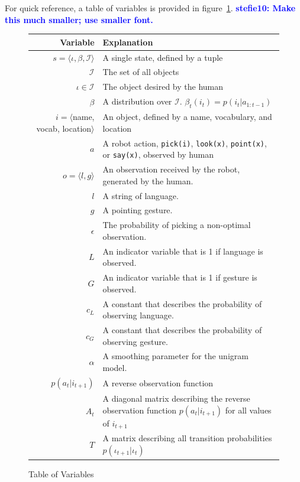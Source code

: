 \documentclass[conference]{IEEEtran}
\newcommand{\stnote}[1]{\textcolor{blue}{\textbf{stefie10: #1}}}
\newcommand{\Iota}{\mathcal{I}}
\begin{document}
For quick reference, a table of variables is provided in figure~\ref{fig:vars}. 
\stnote{Make this much smaller; use smaller font.}
\begin{figure}
	\begin{center}
		\begin{tabular}{r l}
			\hline
			Variable & Explanation\\
			\hline
			$s = \langle \iota, \beta, \Iota \rangle$ & A single state, defined by a tuple \\
			$\Iota$ & The set of all objects \\
			$\iota \in \Iota$ & The object desired by the human \\
			$\beta$ & A distribution over $\Iota$. $\beta_t(i_t) = p(i_t | a_{1:t-1})$ \\
			$i = \langle$name, vocab, location$\rangle$ & An object, defined by a name, vocabulary, and location \\
			$a$ & A robot action, \texttt{pick(i)}, \texttt{look(x)}, \texttt{point(x)}, or \texttt{say(x)}, observed by human  \\
			$o = \langle l, g \rangle$ & An observation received by the robot, generated by the human.  \\
			$l$ & A string of language.  \\
			$g$ & A pointing gesture.  \\
			$\epsilon$ & The probability of picking a non-optimal observation. \\
			$L$ & An indicator variable that is 1 if language is observed.  \\
			$G$ & An indicator variable that is 1 if gesture is observed.  \\
			$c_L$ & A constant that describes the probability of observing language.  \\
			$c_G$ & A constant that describes the probability of observing gesture.  \\
			$\alpha$ & A smoothing parameter for the unigram model.  \\
			$p(a_t | i_{t+1})$ & A reverse observation function \\
			$A_t$ & A diagonal matrix describing the reverse observation function $p(a_t | i_{t+1})$ for all values of $i_{t+1}$ \\
			$T$ & A matrix describing all transition probabilities $p(\iota_{t+1}|\iota_{t})$ \\
			\hline
		\end{tabular}
		\caption{Table of Variables}
		\label{fig:vars}
	\end{center}
\end{figure}
\end{document}
